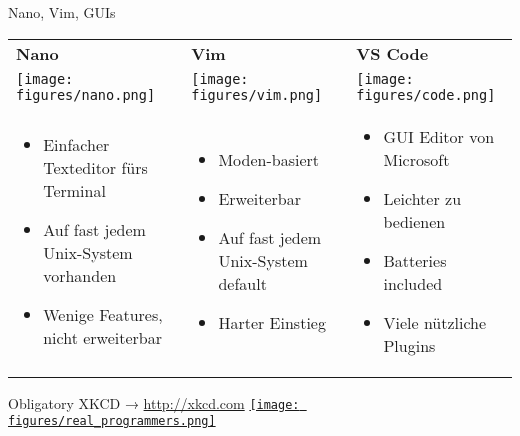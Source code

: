 \begin{frame}{Nano, Vim, GUIs}
  \begin{tabu}{@{} X[,C] @{} X[,C] @{} X[,C] @{}}
    \textbf{\large Nano} & \textbf{\Large Vim} & \textbf{\Large VS Code} \\
    \texttt{[image: figures/nano.png]} &
    \texttt{[image: figures/vim.png]} &
    \texttt{[image: figures/code.png]} \\
    \begin{itemize}
      \item Einfacher Texteditor fürs Terminal
      \item Auf fast jedem Unix-System vorhanden
      \item Wenige Features, nicht erweiterbar
    \end{itemize}
    &
    \begin{itemize}
      \item Moden-basiert
      \item Erweiterbar
      \item Auf fast jedem Unix-System default
      \item Harter Einstieg
    \end{itemize}
    &
    \begin{itemize}
      \item GUI Editor von Microsoft
      \item Leichter zu bedienen
      \item Batteries included
      \item Viele nützliche Plugins
    \end{itemize}
  \end{tabu}
\end{frame}

\begin{frame}{Obligatory XKCD → \url{http://xkcd.com}}
  \centering
  \href{http://xkcd.com/378/}{\texttt{[image: figures/real\_programmers.png]}}
\end{frame}
